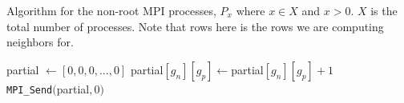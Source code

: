 \documentclass{article}
\begin{document}
\begin{algorithm}
    \caption{Algorithm for the non-root MPI processes, $P_x$ where $x \in X$ and $x > 0$. $X$ is the total number of processes. Note that rows here is the rows we are computing neighbors for. }\label{alg:1}
    \begin{algorithmic}
        \State partial $\gets [0, 0, 0, ..., 0]$
            \State partial$[g_{n}][g_p] \gets $partial$[g_{n}][g_p] + 1$
        \EndIf
        \EndWhile \\
        \State \texttt{MPI\_Send}$($partial$, 0)$
    \end{algorithmic}
\end{algorithm}
\end{document}
